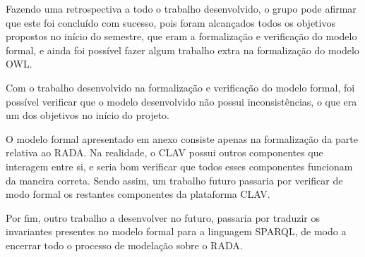 \documentclass{article}
\begin{document}
\par Fazendo uma retrospectiva a todo o trabalho desenvolvido, o grupo pode afirmar que este foi concluído com sucesso, pois foram alcançados todos os objetivos propostos no início do semestre, que eram a formalização e verificação do modelo formal, e ainda foi possível fazer algum trabalho extra na formalização do modelo OWL. %
\par Com o trabalho desenvolvido na formalização e verificação do modelo formal, foi possível verificar que o modelo desenvolvido não possui inconsistências, o que era um dos objetivos no início do projeto.
\par O modelo formal apresentado em anexo consiste apenas na formalização da parte relativa ao RADA. Na realidade, o CLAV possui outros componentes que interagem entre si, e seria bom verificar que todos esses componentes funcionam da maneira correta. Sendo assim, um trabalho futuro passaria por verificar de modo formal os restantes componentes da plataforma CLAV.
\par Por fim, outro trabalho a desenvolver no futuro, passaria por traduzir os invariantes presentes no modelo formal para a linguagem SPARQL, de modo a encerrar todo o processo de modelação sobre o RADA.


\newpage
\begin{thebibliography}{1}

\end{thebibliography}

\clearpage

\appendix
\end{document}
